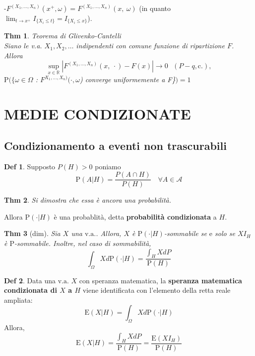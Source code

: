 \documentclass[a4paper,11pt]{article}
\theoremstyle{plain}
\newtheorem{thm}{Thm}[section]
\theoremstyle{definition}
\newtheorem{defn}{Def}[section]
\theoremstyle{remark}
\begin{document}
 \noindent
-$F^{(X_{1},\ldots,X_{n})}(x^{+}, \omega)=F^{(X_{1},\ldots,X_{n})}(x,\ \omega)$ (in quanto $\displaystyle \lim_{t\rightarrow x^{+}}I_{\{X_{i}\leq t\}}=I_{\{X_{i}\leq x\}}$).\\



\begin{thm}Teorema di Glivenko-Cantelli\\
 Siano le v.a. $X_{1}, X_{2}, \ldots$ indipendenti con comune funzione di ripartizione $F$. Allora
$$\displaystyle \sup_{x\in \mathbb{R}} \left| F^{(X_{1},\ldots,X_{n})}(x,\ \cdot)-F(x) \right|\rightarrow 0 \,\,\,\, (P-q, \mathrm{c}.),
$$
$\mathrm{P(}\{\omega\in\Omega$ : $F^{X_{1},\ldots,X_{n})} (\cdot, \omega$) converge uniformemente a F\}$\mathrm{)} =1$
\end{thm}

\newpage
\section{MEDIE CONDIZIONATE}

\subsection{Condizionamento a eventi non trascurabili}

\begin{defn}
Supposto $P(H)>0$ poniamo
$$
\mathrm{P}(A|H)=\frac{P(A \cap H)}{P(H)}\,\, \,\,\,\, \forall A \in  \mathcal{A}
$$
\end{defn}

\begin{thm}
Si dimostra che essa è ancora una probabilità.
\end{thm}

\noindent
Allora $\mathrm{P}(\cdot|H)$ è una probablità, detta \textbf{probabilità condizionata} a $H$. 






\begin{thm}[dim]
Sia $X$ una $\mathrm{v}.\mathrm{a}.$. Allora, $X$ è $\mathrm{P}(\cdot|H)$-sommabile se $\mathrm{e}$ solo se $XI_{H}$ è $\mathrm{P}$-sommabile. Inoltre, nel caso di sommabilità,
$$ \displaystyle
\int_{\Omega}Xd\mathrm{P}(\cdot|H)=\frac{\displaystyle \int_{H}XdP}{\mathrm{P}(H)}
$$
\end{thm}

\begin{defn}
Data una $\mathrm{v}.\mathrm{a}.$ $X$ con speranza matematica, la\textbf{ speranza matematica condizionata di $X$ a $H$} viene identificata con l'elemento della retta reale ampliata:
$$
\mathrm{E}(X|H)=\int_{\Omega}Xd\mathrm{P}(\cdot|H)
$$
Allora,
$$
\displaystyle \mathrm{E}(X|H)=\frac{\displaystyle \int_{H}XdP}{\mathrm{P}(H)}=\frac{\mathrm{E}(XI_{H})}{\mathrm{P}(H)}
$$
\end{defn}
\end{document}
